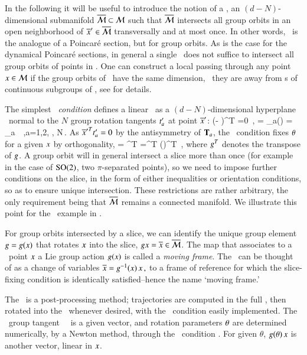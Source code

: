 \documentclass[preprint,number,sort&compress]{elsarticle}
\begin{document}
In the following it will be useful to introduce the notion of
a \emph{\slice}, an $(d-N)$-dimensional submanifold
$\overline{\cal M}\subset{\cal M}$ such that $\overline{\cal M}$ intersects all group
orbits in an open neighborhood of ${\overline{x}'} \in \overline{\cal M}$
transversally and at most once. In other words, \slice\ is
the analogue of a Poincar\'e section, but for group orbits.
As is the case for the dynamical Poincar\'e sections, in
general a single \slice\ does not suffice to intersect all
group orbits of points in \pS. One can construct a local {\slice} passing
through any point $x\in {\cal M}$ if the group orbits of \Group\
have the same dimension, \ie\ {they are} away from {\fixedsp
s} of continuous subgroups of \Group, see
 for details.

The simplest {\em \slice\ condition} defines a linear \slice\ as a
$(d\!-\!N)$-dim\-ens\-ion\-al hyperplane \pSRed\ normal to
the $N$ group rotation tangents $t'_{a}$ at point ${\overline{x}'}$:
\beq
(\sspRed - \slicep )^T  =0
    \,,\qquad
{} = \groupTan_a(\slicep) = \Lg_a \, \slicep
\,,\qquad a=1,2, \cdots, N\,.
As ${\overline{x}'}^T t'_{a} =0$ by the antisymmetry of
$\mathbf{T}_a$, the \slice\ condition  fixes
${\bf \theta}$ for a given $x$ by orthogonality,
 = \sspRed^T  
	=\ssp^T  \LieEl(\gSpace)^T \sliceTan{a}
\,,
where $g^T$ denotes the transpose of $g$. A group
orbit will in general intersect a slice more than once (for
example in the case of $\textrm{SO}(2)$, two $\pi$-separated
points), so we need to impose further conditions on the
slice, in the form of either inequalities or orientation
conditions, so as to ensure unique intersection. These
restrictions are rather arbitrary, the only requirement being
that $\overline{\cal M}$ remains a connected manifold. We illustrate
this point for the \cLf\ example in .

For group orbits intersected by a slice, we can identify the
unique group element $g=g(x)$ that rotates
$x$ into the slice, $gx = \overline{x} \in \overline{\cal M}$. The
map that associates to a \statesp\ point $x$ a Lie group
action $g(x)$ is called a \emph{moving frame}.
The \mframes\ can be thought of as a change of variables
$
\overline{x} = g^{-1}(x) \, x
\,,
$ to a frame of reference for which the slice-fixing condition
 is identically satisfied--hence the name
`moving frame.'

The \mframes\ is a post-processing method; trajectories are
computed in the full \statesp, then rotated into the \slice\
whenever desired, with the \slice\ condition easily
implemented. The \slice\ group tangent \sliceTan\ \, is a
given vector, and rotation parameters ${\bf \theta}$ are
determined numerically, by a Newton method, through the
\slice\ condition \refeq{PCsectQ1}. For given $\theta$,
$g({\bf \theta})\,x$ is another vector, linear in $x$.
\end{document}
